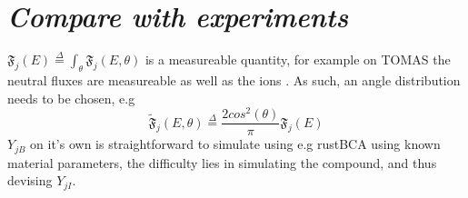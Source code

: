 \documentclass{article}
\begin{document}
\section*{\textit{Compare with experiments}}
$\mathfrak{F}_j(E) \stackrel{\Delta}{=} \int_\theta \mathfrak{F}_j(E,\theta)$ is
a measureable quantity, for example on TOMAS the neutral fluxes are measureable
\cite{DanielNPA} as well as the ions \cite{AndreiRFEA}. As such, an angle distribution needs
to be chosen, e.g 
\begin{equation}
    \tilde{\mathfrak{F}}_j(E,\theta) \stackrel{\Delta}{=} \frac{2cos^2(\theta)}{\pi}\mathfrak{F}_j(E)
\end{equation}
$Y_{jB}$ on it's own is straightforward to simulate using e.g rustBCA using known material
parameters, the difficulty lies in simulating the compound, and thus devising $Y_{jI}$.



\end{document}
